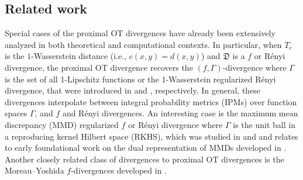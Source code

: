 \documentclass{amsart}
\theoremstyle{definition}
\theoremstyle{remark}
\numberwithin{equation}{section}
\begin{document}
\subsection{Related work}
Special cases of the proximal OT divergences have already been extensively analyzed in both theoretical and
computational contexts. In particular, when $T_c$ is the $1$-Wasserstein distance (i.e., $c(x,y) = d(x,y)$) and $\mathfrak{D}$ is a $f$ or R\'{e}nyi divergence, the proximal OT divergence recovers the $(f,\Gamma)$-divergence where $\Gamma$ is the set of all 1-Lipschitz functions or the 1-Wasserstein regularized R\'{e}nyi divergence, that were introduced in \cite{dupuis2022formulation,birrell2022f} and \cite{birrell2023functionspace}, respectively. In general, these divergences interpolate between integral probability metrics (IPMs) over function spaces $\Gamma$, and $f$ and R\'{e}nyi  divergences. An interesting case is the maximum mean discrepancy (MMD) regularized $f$ or  R\'{e}nyi divergence where $\Gamma$ is the unit ball in a reproducing kernel Hilbert space (RKHS), which was studied in \cite{birrell2022f}  and \cite{birrell2023functionspace} and relates to early foundational work on the dual representation of MMDs developed in \cite{Nguyen_IEEE_2010}. Another closely related class of divergences to proximal OT divergences is the Moreau–Yoshida $f$-divergences developed in \cite{terjek2021moreau}. 
\end{document}
